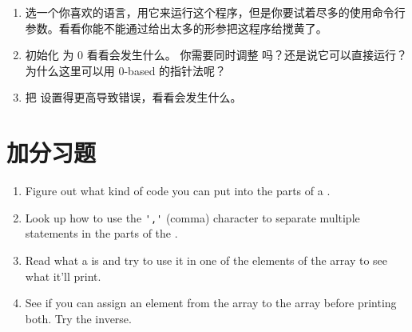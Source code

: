 \begin{enumerate}
\item 选一个你喜欢的语言，用它来运行这个程序，但是你要试着尽多的使用命令行参数。看看你能不能通过给出太多的形参把这程序给搅黄了。
\item 初始化  为 0 看看会发生什么。 你需要同时调整  吗？还是说它可以直接运行？为什么这里可以用 0-based 的指针法呢？
\item 把  设置得更高导致错误，看看会发生什么。
\end{enumerate}

\section{加分习题}

\begin{enumerate}
\item Figure out what kind of code you can put into the parts of a .
\item Look up how to use the \verb|','| (comma) character to separate multiple
    statements in the parts of the .
\item Read what a  is and try to use it in one of the elements of the
     array to see what it'll print.
\item See if you can assign an element from the  array to the
     array before printing both.  Try the inverse.
\end{enumerate}


